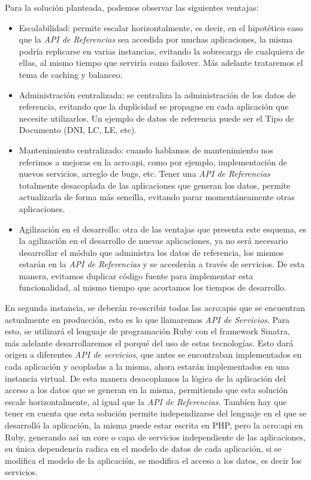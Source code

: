 Para la solución planteada, podemos observar las siguientes ventajas:

\begin{itemize}
  \item Escalabilidad: permite escalar horizontalmente, es decir, en el hipotético caso que la \textit{API de Referencias} sea accedida por muchas aplicaciones, la misma podría replicarse en varias instancias, evitando la sobrecarga de cualquiera de ellas, al mismo tiempo que serviría como failover.  Más adelante trataremos el tema de caching y balanceo.

  \item Administración centralizada: se centraliza la administración de los datos de referencia, evitando que la duplicidad se propague en cada aplicación que necesite utilizarlos.  Un ejemplo de datos de referencia puede ser el Tipo de Documento (DNI, LC, LE, etc).

  \item Mantenimiento centralizado: cuando hablamos de mantenimiento nos referimos a mejoras en la \gls{acro:api}, como por ejemplo, implementación de nuevos servicios, arreglo de bugs, etc.  Tener una \textit{API de Referencias} totalmente desacoplada de las aplicaciones que generan los datos, permite actualizarla de forma más sencilla, evitando parar momentáneamente otras aplicaciones.

  \item Agilización en el desarrollo: otra de las ventajas que presenta este esquema, es la agilización en el desarrollo de nuevas aplicaciones, ya no será necesario desarrollar el módulo que administra los datos de referencia, los mismos estarán en la \textit{API de Referencias} y se accederán a través de servicios.  De esta manera, evitamos duplicar código fuente para implementar esta funcionalidad, al mismo tiempo que acortamos los tiempos de desarrollo.
\end{itemize}

En segunda instancia, se deberán re-escribir todas las \glspl{acro:api} que se encuentran actualmente en producción, esto es lo que llamaremos \textit{API de Servicios}.  Para esto, se utilizará el lenguaje de programación Ruby con el framework Sinatra, más adelante desarrollaremos el porqué del uso de estas tecnologías.  Esto dará origen a diferentes \textit{API de servicios}, que antes se encontraban implementados en cada aplicación y acopladas a la misma, ahora estarán implementados en una instancia virtual.
De esta manera desacoplamos la lógica de la aplicación del acceso a los datos que se generan en la misma, permitiendo que esta solución escale horizontalmente, al igual que la \textit{API de Referencias}.
Tambíen hay que tener en cuenta que esta solución permite independizarse del lenguaje en el que se desarrolló la aplicación, la misma puede estar escrita en PHP, pero la \gls{acro:api} en Ruby, generando así un core o capa de servicios independiente de las aplicaciones, su única dependencia radica en el modelo de datos de cada aplicación, si se modifica el modelo de la aplicación, se modifica el acceso a los datos, es decir los servicios.

